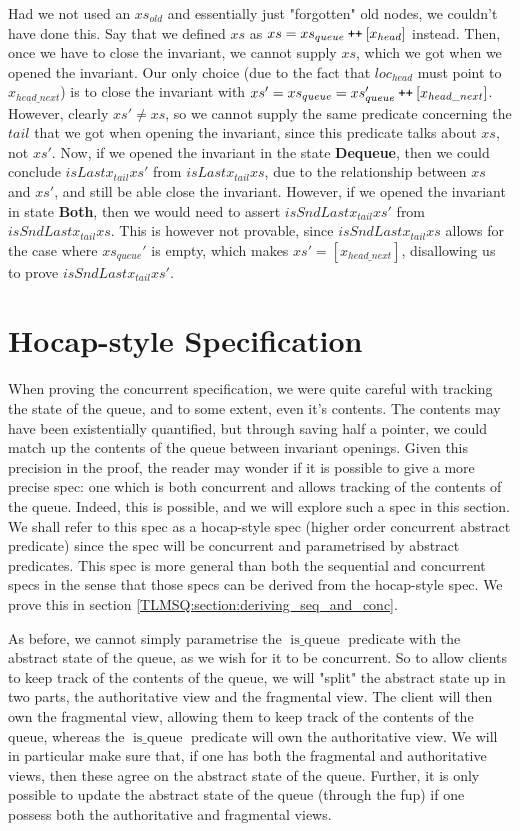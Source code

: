 \documentclass[twoside,11pt,openright]{report}
\newcommand{\isqueue}{\operatorname{is\_queue}}
\newcommand{\DequeueState}{\textbf{Dequeue}}
\newcommand{\BothState}{\textbf{Both}}
\newcommand\catenate{\mathbin{\text{\ttfamily\upshape ++}}}
\begin{document}
Had we not used an $xs_{old}$ and essentially just "forgotten" old nodes, we couldn't have done this. Say that we defined $xs$ as $xs = xs_{queue} \catenate [x_{head}]$ instead. Then, once we have to close the invariant, we cannot supply $xs$, which we got when we opened the invariant. Our only choice (due to the fact that $loc_{head}$ must point to $x_{head\_next}$) is to close the invariant with $xs' = xs_{queue} = xs_{queue}' \catenate [x_{head\_next}]$. However, clearly $xs' \neq xs$, so we cannot supply the same predicate concerning the $tail$ that we got when opening the invariant, since this predicate talks about $xs$, not $xs'$. Now, if we opened the invariant in the state \DequeueState{}, then we could conclude $isLast x_{tail} xs'$ from $isLast x_{tail} xs$, due to the relationship between $xs$ and $xs'$, and still be able close the invariant. However, if we opened the invariant in state \BothState{}, then we would need to assert $isSndLast x_{tail} xs'$ from $isSndLast x_{tail} xs$. This is however not provable, since $isSndLast x_{tail} xs$ allows for the case where $xs_{queue}'$ is empty, which makes $xs' = [x_{head\_next}]$, disallowing us to prove $isSndLast x_{tail} xs'$.


\section{Hocap-style Specification}
\label{TLMSQ:section:hocap}

When proving the concurrent specification, we were quite careful with tracking the state of the queue, and to some extent, even it's contents. The contents may have been existentially quantified, but through saving half a pointer, we could match up the contents of the queue between invariant openings. Given this precision in the proof, the reader may wonder if it is possible to give a more precise spec: one which is both concurrent and allows tracking of the contents of the queue. Indeed, this is possible, and we will explore such a spec in this section. We shall refer to this spec as a hocap-style spec (higher order concurrent abstract predicate) since the spec will be concurrent and parametrised by abstract predicates. This spec is more general than both the sequential and concurrent specs in the sense that those specs can be derived from the hocap-style spec. We prove this in section \ref{TLMSQ:section:deriving_seq_and_conc}.

As before, we cannot simply parametrise the $\isqueue$ predicate with the abstract state of the queue, as we wish for it to be concurrent. So to allow clients to keep track of the contents of the queue, we will "split" the abstract state up in two parts, the authoritative view and the fragmental view. The client will then own the fragmental view, allowing them to keep track of the contents of the queue, whereas the $\isqueue$ predicate will own the authoritative view. We will in particular make sure that, if one has both the fragmental and authoritative views, then these agree on the abstract state of the queue. Further, it is only possible to update the abstract state of the queue (through the fup) if one possess both the authoritative and fragmental views.
\end{document}
